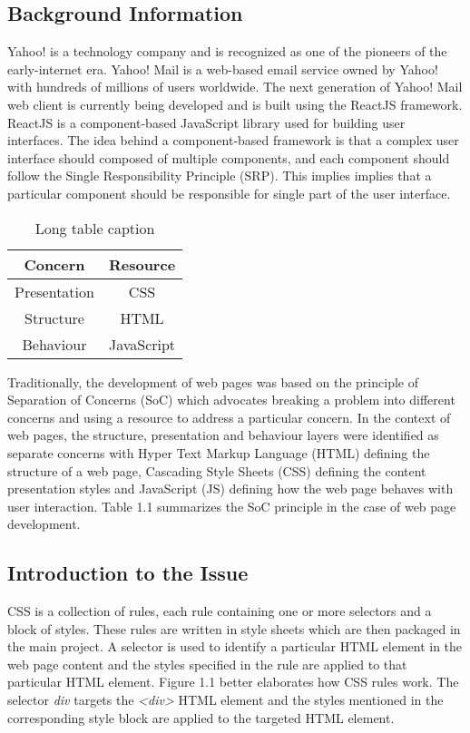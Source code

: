 \documentclass[12pt]{article}
\begin{document}
\subsection{Background Information}

Yahoo! is a technology company and is recognized as one of the pioneers of the early-internet era. Yahoo! Mail is a web-based email service owned by Yahoo! with hundreds of millions of users worldwide. The next generation of Yahoo! Mail web client is currently being developed and is built using the ReactJS framework. ReactJS is a component-based JavaScript library used for building user interfaces. The idea behind a component-based framework is that a complex user interface should composed of multiple components, and each component should follow the Single Responsibility Principle (SRP). This implies implies that a particular component should be responsible for single part of the user interface.

\vspace{0.5cm}

\begin{table}[h]
	\centering
	\begin{tabular}{|c|c|}
		\hline
		\textbf{Concern} & \textbf{Resource} \\ 
		\hline
		Presentation & CSS \\
		\hline 
		Structure & HTML \\
		\hline
		Behaviour & JavaScript \\
		\hline
	\end{tabular}
	\caption{Long table caption}
\end{table}

\vspace{0.5cm}

Traditionally, the development of web pages was based on the principle of Separation of Concerns (SoC) which advocates breaking a problem into different concerns and using a resource to address a particular concern. In the context of web pages, the structure, presentation and behaviour layers were identified as separate concerns with Hyper Text Markup Language (HTML) defining the structure of a web page, Cascading Style Sheets (CSS) defining the content presentation styles and JavaScript (JS) defining how the web page behaves with user interaction. Table 1.1 summarizes the SoC principle in the case of web page development.

\subsection{Introduction to the Issue}
CSS is a collection of rules, each rule containing one or more selectors and a block of styles. These rules are written in style sheets which are then packaged in the main project. A selector is used to identify a particular HTML element in the web page content and the styles specified in the rule are applied to that particular HTML element. Figure 1.1 better elaborates how CSS rules work. The selector \textit{div} targets the \textit{<div>} HTML element and the styles mentioned in the corresponding style block are applied to the targeted HTML element.
\end{document}

